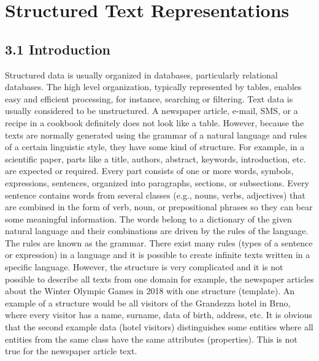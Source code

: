 \documentclass[10pt]{book}
\begin{document}
\section*{Structured Text Representations}
\subsection*{3.1 Introduction}
Structured data is usually organized in databases, particularly relational databases. The high level organization, typically represented by tables, enables easy and efficient processing, for instance, searching or filtering. Text data is usually considered to be unstructured. A newspaper article, e-mail, SMS, or a recipe in a cookbook definitely does not look like a table. However, because the texts are normally generated using the grammar of a natural language and rules of a certain linguistic style, they have some kind of structure. For example, in a scientific paper, parts like a title, authors, abstract, keywords, introduction, etc. are expected or required. Every part consists of one or more words, symbols, expressions, sentences, organized into paragraphs, sections, or subsections. Every sentence contains words from several classes (e.g., nouns, verbs, adjectives) that are combined in the form of verb, noun, or prepositional phrases so they can bear some meaningful information. The words belong to a dictionary of the given natural language and their combinations are driven by the rules of the language. The rules are known as the grammar. There exist many rules (types of a sentence or expression) in a language and it is possible to create infinite texts written in a specific language. However, the structure is very complicated and it is not possible to describe all texts from one domain for example, the newspaper articles about the Winter Olympic Games in 2018 with one structure (template). An example of a structure would be all visitors of the Grandezza hotel in Brno, where every visitor has a name, surname, data of birth, address, etc. It is obvious\\
that the second example data (hotel visitors) distinguishes some entities where all entities from the same class have the same attributes (properties). This is not true for the newspaper article text.
\end{document}
